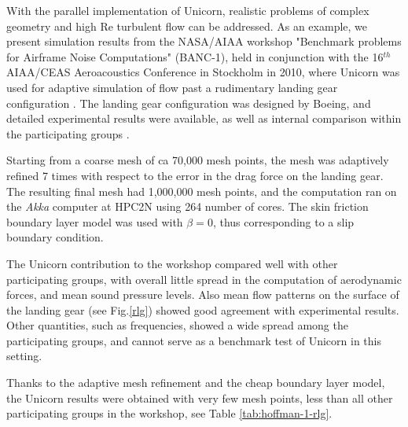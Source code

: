 With the parallel implementation of Unicorn, realistic problems of complex geometry and high Re turbulent flow can be addressed. As an example, we present simulation results from the NASA/AIAA workshop "Benchmark problems for Airframe Noise Computations" (BANC-1), held in conjunction with the 16$^{th}$ AIAA/CEAS Aeroacoustics Conference in Stockholm in 2010, where Unicorn was used for adaptive simulation of flow past a rudimentary landing gear configuration \cite{VilelaJanssonEtAl2010}. The landing gear configuration was designed by Boeing, and detailed experimental results were available, as well as internal comparison within the participating groups \cite{SpalartMejia2011}. 

Starting from a coarse mesh of ca 70,000 mesh points, the mesh was adaptively refined 7 times with respect to the error in the drag force on the landing gear. The resulting final mesh had 1,000,000 mesh points, and the computation ran on the \textit{Akka} computer at HPC2N using 264 number of cores. The skin friction boundary layer model was used with $\beta=0$, thus corresponding to a slip boundary condition.

The Unicorn contribution to the workshop compared well with other participating groups, with overall little spread in the computation of aerodynamic forces, and mean sound pressure levels. Also mean flow patterns on the surface of the landing gear (see Fig.\ref{rlg}) showed good agreement with experimental results. Other quantities, such as frequencies, showed a wide spread among the participating groups, and cannot serve as a benchmark test of Unicorn in this setting.

Thanks to the adaptive mesh refinement and the cheap boundary layer model, the Unicorn results were obtained with very few mesh points, less than all other participating groups in the workshop, see Table \ref{tab:hoffman-1-rlg}.


